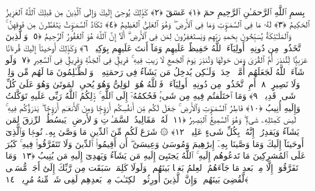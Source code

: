 
  
    
  
    
    

\nopagebreak
  بِسمِ ٱللَّهِ ٱلرَّحمَـٰنِ ٱلرَّحِيمِ
  حمٓ ﴿١﴾
 عٓسٓقٓ ﴿٢﴾
 كَذَٟلِكَ يُوحِىٓ إِلَيكَ وَإِلَى ٱلَّذِينَ مِن قَبلِكَ ٱللَّهُ ٱلعَزِيزُ ٱلحَكِيمُ ﴿٣﴾
 لَهُۥ مَا فِى ٱلسَّمَـٰوَٟتِ وَمَا فِى ٱلأَرضِ ۖ وَهُوَ ٱلعَلِىُّ ٱلعَظِيمُ ﴿٤﴾
 تَكَادُ ٱلسَّمَـٰوَٟتُ يَتَفَطَّرنَ مِن فَوقِهِنَّ ۚ وَٱلمَلَـٰٓئِكَةُ يُسَبِّحُونَ بِحَمدِ رَبِّهِم وَيَستَغفِرُونَ لِمَن فِى ٱلأَرضِ ۗ أَلَآ إِنَّ ٱللَّهَ هُوَ ٱلغَفُورُ ٱلرَّحِيمُ ﴿٥﴾
 وَٱلَّذِينَ ٱتَّخَذُوا۟ مِن دُونِهِۦٓ أَولِيَآءَ ٱللَّهُ حَفِيظٌ عَلَيهِم وَمَآ أَنتَ عَلَيهِم بِوَكِيلٍۢ ﴿٦﴾
 وَكَذَٟلِكَ أَوحَينَآ إِلَيكَ قُرءَانًا عَرَبِيًّۭا لِّتُنذِرَ أُمَّ ٱلقُرَىٰ وَمَن حَولَهَا وَتُنذِرَ يَومَ ٱلجَمعِ لَا رَيبَ فِيهِ ۚ فَرِيقٌۭ فِى ٱلجَنَّةِ وَفَرِيقٌۭ فِى ٱلسَّعِيرِ ﴿٧﴾
 وَلَو شَآءَ ٱللَّهُ لَجَعَلَهُم أُمَّةًۭ وَٟحِدَةًۭ وَلَـٰكِن يُدخِلُ مَن يَشَآءُ فِى رَحمَتِهِۦ ۚ وَٱلظَّـٰلِمُونَ مَا لَهُم مِّن وَلِىٍّۢ وَلَا نَصِيرٍ ﴿٨﴾
 أَمِ ٱتَّخَذُوا۟ مِن دُونِهِۦٓ أَولِيَآءَ ۖ فَٱللَّهُ هُوَ ٱلوَلِىُّ وَهُوَ يُحىِ ٱلمَوتَىٰ وَهُوَ عَلَىٰ كُلِّ شَىءٍۢ قَدِيرٌۭ ﴿٩﴾
 وَمَا ٱختَلَفتُم فِيهِ مِن شَىءٍۢ فَحُكمُهُۥٓ إِلَى ٱللَّهِ ۚ ذَٟلِكُمُ ٱللَّهُ رَبِّى عَلَيهِ تَوَكَّلتُ وَإِلَيهِ أُنِيبُ ﴿١٠﴾
 فَاطِرُ ٱلسَّمَـٰوَٟتِ وَٱلأَرضِ ۚ جَعَلَ لَكُم مِّن أَنفُسِكُم أَزوَٟجًۭا وَمِنَ ٱلأَنعَـٰمِ أَزوَٟجًۭا ۖ يَذرَؤُكُم فِيهِ ۚ لَيسَ كَمِثلِهِۦ شَىءٌۭ ۖ وَهُوَ ٱلسَّمِيعُ ٱلبَصِيرُ ﴿١١﴾
 لَهُۥ مَقَالِيدُ ٱلسَّمَـٰوَٟتِ وَٱلأَرضِ ۖ يَبسُطُ ٱلرِّزقَ لِمَن يَشَآءُ وَيَقدِرُ ۚ إِنَّهُۥ بِكُلِّ شَىءٍ عَلِيمٌۭ ﴿١٢﴾
 ۞ شَرَعَ لَكُم مِّنَ ٱلدِّينِ مَا وَصَّىٰ بِهِۦ نُوحًۭا وَٱلَّذِىٓ أَوحَينَآ إِلَيكَ وَمَا وَصَّينَا بِهِۦٓ إِبرَٰهِيمَ وَمُوسَىٰ وَعِيسَىٰٓ ۖ أَن أَقِيمُوا۟ ٱلدِّينَ وَلَا تَتَفَرَّقُوا۟ فِيهِ ۚ كَبُرَ عَلَى ٱلمُشرِكِينَ مَا تَدعُوهُم إِلَيهِ ۚ ٱللَّهُ يَجتَبِىٓ إِلَيهِ مَن يَشَآءُ وَيَهدِىٓ إِلَيهِ مَن يُنِيبُ ﴿١٣﴾
 وَمَا تَفَرَّقُوٓا۟ إِلَّا مِنۢ بَعدِ مَا جَآءَهُمُ ٱلعِلمُ بَغيًۢا بَينَهُم ۚ وَلَولَا كَلِمَةٌۭ سَبَقَت مِن رَّبِّكَ إِلَىٰٓ أَجَلٍۢ مُّسَمًّۭى لَّقُضِىَ بَينَهُم ۚ وَإِنَّ ٱلَّذِينَ أُورِثُوا۟ ٱلكِتَـٰبَ مِنۢ بَعدِهِم لَفِى شَكٍّۢ مِّنهُ مُرِيبٍۢ ﴿١٤﴾
